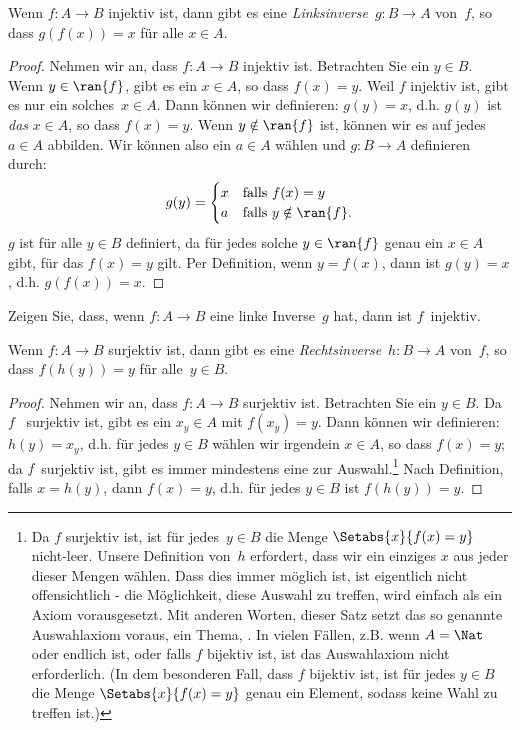\documentclass[../../../include/open-logic-section]{subfiles}
\begin{document}
\begin{prop}
Wenn $f\colon A \to B$ injektiv ist, dann gibt es eine 
\emph{Linksinverse}~$g\colon B \to A$ von~$f$, so dass $g(f(x)) = x$ für alle $x
\in A$.
\end{prop}

\begin{proof}
Nehmen wir an, dass $f\colon A \to B$ injektiv ist. Betrachten Sie ein $y \in B$.
Wenn $y \in \ran{f}$, gibt es ein $x \in A$, so dass $f(x) = y$. Weil
$f$ injektiv ist, gibt es nur ein solches~$x \in A$. Dann können wir
definieren: $g(y) = x$, d.h. $g(y)$ ist \emph{das} $x \in A$, so dass $f(x)
= y$.  Wenn $y \notin \ran{f}$ ist, können wir es auf jedes~$a \in A$ abbilden. Wir können also
ein $a \in A$ wählen und $g \colon B \to A$ definieren durch:
\[
g(y) = \begin{cases}
    x & \text{falls $f(x) = y$}\\
    a & \text{falls $y \notin \ran{f}$.}
\end{cases}
\]
$g$ ist für alle $y \in B$ definiert, da für jedes solche $y \in \ran{f}$
genau ein $x \in A$ gibt, für das $f(x) = y$ gilt. Per Definition, wenn
$y = f(x)$, dann ist $g(y) = x$, d.h. $g(f(x)) = x$.
\end{proof}

\begin{prob}
Zeigen Sie, dass, wenn $f\colon A \to B$ eine linke Inverse~$g$ hat, dann ist $f$~injektiv.
\end{prob}

\begin{prop}
    Wenn $f \colon A \to B$ surjektiv ist, dann gibt es eine
    \emph{Rechtsinverse}~$h\colon B \to A$ von~$f$, so dass $f(h(y)) =
    y$ für alle~$y \in B$.
\end{prop}

\begin{proof}
Nehmen wir an, dass $f\colon A \to B$ surjektiv ist. Betrachten Sie ein $y \in
B$. Da $f$~ surjektiv ist, gibt es ein $x_y \in A$ mit $f(x_y)
= y$.  Dann können wir definieren: $h(y) = x_y$, d.h. für jedes $y \in B$ wählen wir
irgendein $x \in A$, so dass $f(x) = y$; da $f$~surjektiv ist,
gibt es immer mindestens eine zur Auswahl.\footnote{Da $f$
surjektiv ist, ist für jedes~$y \in B$ die Menge $\Setabs{x}{f(x) = y}$
nicht-leer. Unsere Definition von~$h$ erfordert, dass wir ein einziges $x$
aus jeder dieser Mengen wählen. Dass dies immer möglich ist, ist eigentlich nicht
offensichtlich - die Möglichkeit, diese Auswahl zu treffen, wird einfach als ein Axiom vorausgesetzt. 
Mit anderen Worten, dieser Satz setzt das so genannte Auswahlaxiom voraus, ein Thema,
. 
In vielen Fällen, z.B. wenn $A = \Nat$ oder endlich ist, oder falls $f$ bijektiv ist,
ist das Auswahlaxiom nicht erforderlich. (In dem besonderen Fall, dass $f$ bijektiv ist,
ist für jedes $y \in B$ die Menge 
$\Setabs{x}{f(x) = y}$ genau ein Element, sodass keine Wahl zu treffen ist.)} 
Nach Definition, falls $x = h(y)$,
dann $f(x) = y$, d.h. für jedes $y \in B$ ist $f(h(y)) = y$.
\end{proof}
\end{document}

